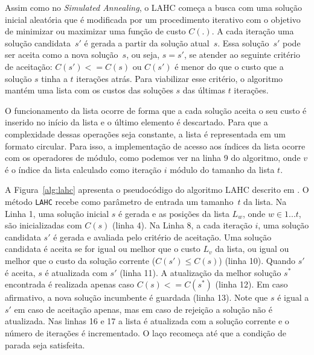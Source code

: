 \documentclass[cic,tc, twoside]{iiufrgs}
\begin{document}
Assim como no \textit{Simulated Annealing}, o LAHC começa a busca com uma solução inicial aleatória que é modificada por um procedimento iterativo com o objetivo de minimizar ou maximizar uma função de custo $C(.)$.
A cada iteração uma solução candidata~$s'$ é gerada a partir da solução atual~$s$. 
Essa solução~$s'$ pode ser aceita como a nova solução~$s$, ou seja, $s = s'$, se atender ao seguinte critério de aceitação: $C(s') <= C(s)$ ou $C(s')$ é menor do que o custo que a solução $s$ tinha a $t$ iterações atrás. 
Para viabilizar esse critério, o algoritmo mantém uma lista com os custos das soluções $s$ das últimas $t$ iterações. 

O funcionamento da lista ocorre de forma que a cada solução aceita o seu custo é inserido no início da lista e o último elemento é descartado. Para que a complexidade dessas operações seja constante, a lista é representada em um formato circular. 
Para isso, a implementação de acesso aos índices da lista ocorre com os operadores de módulo, como podemos ver na linha 9 do algoritmo, onde $v$ é o índice da lista calculado como iteração $i$ módulo do tamanho da lista $t$.

A Figura~\ref{alg:lahc} apresenta o pseudocódigo do algoritmo LAHC descrito em \citet{burke2012late}.  
O método \texttt{LAHC} recebe como parâmetro de entrada um tamanho~$t$ da lista.
Na Linha 1, uma solução inicial $s$ é gerada e as posições da lista $L_w$, onde $w \in {1... t}$,  são inicializadas com $C(s)$ (linha 4). Na Linha 8, a cada iteração $i$, uma solução candidata $s'$ é gerada e avaliada pelo critério de aceitação.
Uma solução candidata é aceita se for igual ou melhor que o custo $L_v$ da lista, ou igual ou melhor que o custo da solução corrente ($C(s') \le C(s)$) (linha 10).
Quando $s'$ é aceita, $s$ é atualizada com $s'$ (linha 11). 
A atualização da melhor solução $s^*$ encontrada é realizada apenas caso $C(s) <= C(s^*)$ (linha 12). Em caso afirmativo, a nova solução incumbente é guardada (linha 13). 
Note que $s$ é igual a $s'$ em caso de aceitação apenas, mas em caso de rejeição a solução não é atualizada.
Nas linhas 16 e 17 a lista é atualizada com a solução corrente e o número de iterações é incrementado. O laço recomeça até que a condição de parada seja satisfeita.
\end{document}

